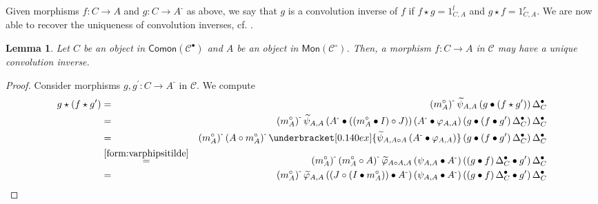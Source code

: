 \documentclass[nosumlimits,twoside]{amsart}
\newtheorem{lemma}[lemma]{\sc Lemma}
\theoremstyle{definition}
\theoremstyle{remark}
\def\revsn{\text{-}}
\newcommand{\Cc}{\mathcal{C}}
\begin{document}
Given %
morphisms $f:C\rightarrow A$ and $g:C\rightarrow A^{\revsn
}$ as above, we say that $g$ is a convolution inverse of $f$ if $f \star g=1^{l}_{C,A}$ and $g \star f=1^{r}_{C,A}$.
We are now able to recover the uniqueness of convolution inverses, cf. \cite[Proposition 6.2]{Bohm-Lack}.

\begin{lemma}
\label{lem:uniqinv}
\bigskip Let $C$ be an object in $\mathsf{Comon}(\Cc^{\bullet})$ and $A$ be an object in $\mathsf{Mon}(\Cc^{\circ})$. Then, a morphism $
f:C\rightarrow A$ in $\Cc$ may have a unique convolution inverse.
\end{lemma}

\begin{proof}
Consider morphisms $g,g^{\prime }:C\rightarrow A^{\revsn }$ in $\Cc$. 
We compute
\begin{eqnarray*}
g\star \left( f\star g^{\prime }\right)  &=&\left( m_{A}^{\circ }\right) ^{%
\revsn}\widetilde{\psi }_{A,A}\left( g\bullet \left( f\star g^{\prime
}\right) \right) \Delta _{C}^{\bullet } \\
&=&\left( m_{A}^{\circ }\right) ^{\revsn}\widetilde{\psi }_{A,A}\left( A^{%
\revsn}\bullet \left( \left( m_{A}^{\circ }\bullet I\right) \circ J\right)
\right) \left( A^{\revsn}\bullet \varphi _{A,A}\right) \left( g\bullet
\left( f\bullet g^{\prime }\right) \Delta _{C}^{\bullet }\right) \Delta
_{C}^{\bullet } \\
&=&\left( m_{A}^{\circ }\right) ^{\revsn}\left( A\circ m_{A}^{\circ }\right)
^{\revsn}\underbracket[0.140ex]{\widetilde{\psi }_{A,A\circ A}\left(
A^{\revsn }\bullet \varphi _{A,A}\right) }\left( g\bullet \left( f\bullet
g^{\prime }\right) \Delta _{C}^{\bullet }\right) \Delta _{C}^{\bullet } \\
&\overset{\eqref{form:varphipsitilde}}{=}&\left( m_{A}^{\circ }\right) ^{%
\revsn}\left( m_{A}^{\circ }\circ A\right) ^{\revsn}\widetilde{\varphi }%
_{A\circ A,A}\left( \psi _{A,A}\bullet A^{\revsn}\right) \left( \left(
g\bullet f\right) \Delta _{C}^{\bullet }\bullet g^{\prime }\right) \Delta
_{C}^{\bullet } \\
&=&\left( m_{A}^{\circ }\right) ^{\revsn}\widetilde{\varphi }_{A,A}\left(
\left( J\circ \left( I\bullet m_{A}^{\circ }\right) \right) \bullet A^{\revsn%
}\right) \left( \psi _{A,A}\bullet A^{\revsn}\right) \left( \left( g\bullet
f\right) \Delta _{C}^{\bullet }\bullet g^{\prime }\right) \Delta
_{C}^{\bullet } \\

\end{eqnarray*}
\end{proof}
\end{document}
